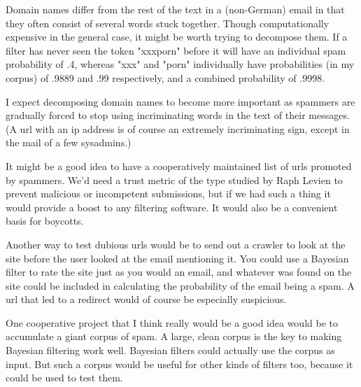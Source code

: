 Domain names differ from the
                    rest of the text in a (non-German) email in that they often
                    consist of several words stuck together. Though
                    computationally expensive in the general case, it might be
                    worth trying to decompose them. If a filter has never seen
                    the token "xxxporn" before it will have an individual spam
                    probability of .4, whereas "xxx" and "porn" individually
                    have probabilities (in my corpus) of .9889 and .99
                    respectively, and a combined probability of .9998.

I
                    expect decomposing domain names to become more important as
                    spammers are gradually forced to stop using incriminating
                    words in the text of their messages. (A url with an ip
                    address is of course an extremely incriminating sign, except
                    in the mail of a few sysadmins.)

It might be a
                    good idea to have a cooperatively maintained list of urls
                    promoted by spammers. We'd need a trust metric of the type
                    studied by Raph Levien to prevent malicious or incompetent
                    submissions, but if we had such a thing it would provide a
                    boost to any filtering software. It would also be a
                    convenient basis for boycotts.

Another way to
                    test dubious urls would be to send out a crawler to look at
                    the site before the user looked at the email mentioning it.
                    You could use a Bayesian filter to rate the site just as you
                    would an email, and whatever was found on the site could be
                    included in calculating the probability of the email being a
                    spam. A url that led to a redirect would of course be
                    especially suspicious.

One cooperative project
                    that I think really would be a good idea would be to
                    accumulate a giant corpus of spam. A large, clean corpus is
                    the key to making Bayesian filtering work well. Bayesian
                    filters could actually use the corpus as input. But such a
                    corpus would be useful for other kinds of filters too,
                    because it could be used to test them.

